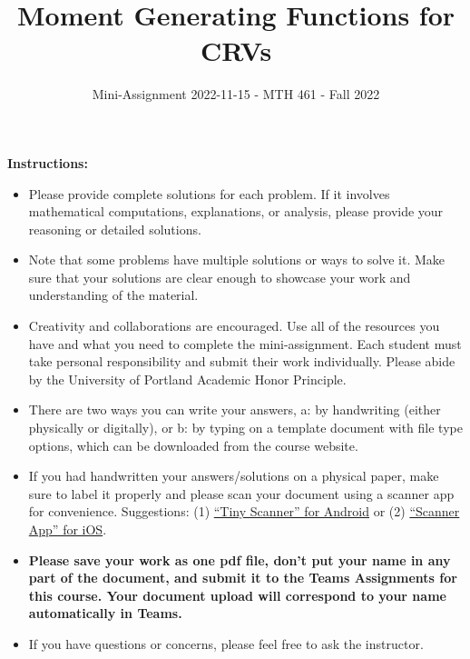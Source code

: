 \documentclass[
]{article}
\title{\textbf{Moment Generating Functions for CRVs}}
\subtitle{Mini-Assignment 2022-11-15 - MTH 461 - Fall 2022}
\author{}
\date{\vspace{-2.5em}}
\begin{document}
\maketitle

\hfill\break

\textbf{Instructions:}

\begin{itemize}
\item
  Please provide complete solutions for each problem. If it involves mathematical computations, explanations, or analysis, please provide your reasoning or detailed solutions.
\item
  Note that some problems have multiple solutions or ways to solve it. Make sure that your solutions are clear enough to showcase your work and understanding of the material.
\item
  Creativity and collaborations are encouraged. Use all of the resources you have and what you need to complete the mini-assignment. Each student must take personal responsibility and submit their work individually. Please abide by the University of Portland Academic Honor Principle.
\item
  There are two ways you can write your answers, a: by handwriting (either physically or digitally), or b: by typing on a template document with file type options, which can be downloaded from the course website.
\item
  If you had handwritten your answers/solutions on a physical paper, make sure to label it properly and please scan your document using a scanner app for convenience. Suggestions: (1) \href{https://play.google.com/store/apps/details?id=com.appxy.tinyscanner\&hl=en_US\&gl=US}{``Tiny Scanner'' for Android} or (2) \href{https://apps.apple.com/us/app/scanner-app-scan-pdf-document/id595563753}{``Scanner App'' for iOS}.
\item
  \textbf{Please save your work as one pdf file, don't put your name in any part of the document, and submit it to the Teams Assignments for this course. Your document upload will correspond to your name automatically in Teams.}
\item
  If you have questions or concerns, please feel free to ask the instructor.
\end{itemize}

\newpage
\end{document}
